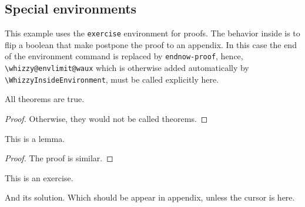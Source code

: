 \documentclass{article}
\newenvironment{drawer}[1]{\subsection{#1}}{}
\begin{document}
\begin{drawer}{Special environments}
This example uses the \verb"exercise" environment for proofs.
The behavior inside is to flip a boolean that make postpone the proof to an
appendix. In this case the end of the environment command is replaced
by \verb"endnow-proof", hence, 
\verb"\whizzy@envlimit@waux" which is otherwise added automatically by
\verb"\WhizzyInsideEnvironment", must be called explicitly here.
\begin{theorem}
All theorems are true.
\end{theorem}
\begin{proof}{}
Otherwise, they would not be called theorems. 
\end{proof}
\begin{lemma}
This is a lemma. 
\end{lemma}
\begin{proof}{}
The proof is similar.
\end{proof}
\end{drawer}

\begin{exercise}
This is an exercise.
\begin{answer}
And its solution. 
Which should be appear in appendix, unless the cursor is here.
\end{answer}
\end{exercise}

\end{document}
